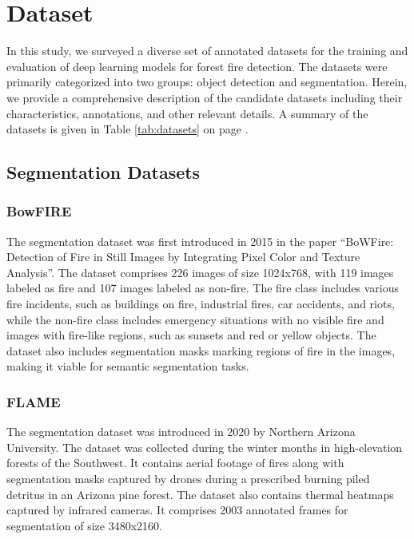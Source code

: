 \section{Dataset}

In this study, we surveyed a diverse set of annotated datasets for the training and evaluation of deep learning models for forest fire detection. The datasets were primarily categorized into two groups: object detection and segmentation. Herein, we provide a comprehensive description of the candidate datasets including their characteristics, annotations, and other relevant details. A summary of the datasets is given in Table \ref{tab:datasets} on page \pageref{tab:datasets}.


\subsection{Segmentation Datasets}

\subsubsection{BowFIRE \cite{chino_bowfire_2015}}
The segmentation dataset was first introduced in 2015 in the paper “BoWFire: Detection of Fire in Still Images by Integrating Pixel Color and Texture Analysis”. The dataset comprises 226 images of size 1024x768, with 119 images labeled as fire and 107 images labeled as non-fire. The fire class includes various fire incidents, such as buildings on fire, industrial fires, car accidents, and riots, while the non-fire class includes emergency situations with no visible fire and images with fire-like regions, such as sunsets and red or yellow objects. The dataset also includes segmentation masks marking regions of fire in the images, making it viable for semantic segmentation tasks.

\subsubsection{FLAME \cite{shamsoshoara_aerial_2020}}
The segmentation dataset was introduced in 2020 by Northern Arizona University. The dataset was collected during the winter months in high-elevation forests of the Southwest. It contains aerial footage of fires along with segmentation masks captured by drones during a prescribed burning piled detritus in an Arizona pine forest. The dataset also contains thermal heatmaps captured by infrared cameras. It comprises 2003 annotated frames for segmentation of size 3480x2160.


